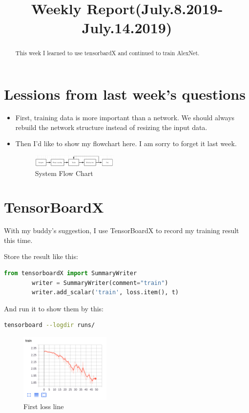 \documentclass{article} %
\title{Weekly Report(July.8.2019-July.14.2019)}
\begin{document}
\maketitle

\begin{abstract}
This week I learned to use tensorbardX and continued to train AlexNet.
  
\end{abstract}

\section{Lessions from last week's questions}

\begin{itemize}
\item First, training data is more important than a network. We should always rebuild the network structure instead of resizing the input data.

\item Then I'd like to show my flowchart here. I am sorry to forget it last week. 

\begin{figure}[hb]
	\centering  %
	\includegraphics[width=0.4\textwidth]{6.png} 
	\caption{System Flow Chart}  %
	\label{fig:f1}   %
\end{figure}

\end{itemize}

\section{TensorBoardX}
With my buddy's suggestion, I use TensorBoardX to record my training result this time.

Store the result like this:
\begin{lstlisting}[language=python]
		from tensorboardX import SummaryWriter 
		writer = SummaryWriter(comment="train")
		writer.add_scalar('train', loss.item(), t)
\end{lstlisting}

And run it to show them by this:
\begin{lstlisting}[language=bash]
		tensorboard --logdir runs/
\end{lstlisting}

\begin{figure}[h]
	\centering  %
	\includegraphics[width=0.4\textwidth]{1.png} 
	\caption{First loss line}  %
	\label{fig:f1}   %
\end{figure}
\end{document}
